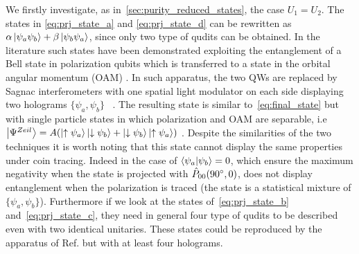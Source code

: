 \documentclass[
	aps, pra,
	superscriptaddress, twocolumn,
	floatfix,
	10pt
]{revtex4-1}
\newcommand{\parTitle}[1]{\noindent{\color{Mahogany}(\emph{#1})}}
\begin{document}
\parTitle{Case with same QW on both sides}
We firstly investigate, as in~\cref{sec:purity_reduced_states}, the case $U_1 = U_2$. The states in \cref{eq:prj_state_a} and  \cref{eq:prj_state_d} can be rewritten as $\alpha \ket{\psi_a \psi_b} + \beta \ket{\psi_b \psi_a}$, since only two type of qudits can be obtained.
In the literature such states have been demonstrated exploiting the entanglement of a Bell state in polarization qubits which is transferred to a state in the orbital angular momentum (OAM) .
In such apparatus, the two QWs are replaced by Sagnac interferometers with one spatial light modulator on each side displaying two holograms $\{\psi_a, \psi_b\}$~\cite{fickler2012quantum} . The resulting state is similar to~\cref{eq:final_state} but with single particle states in which polarization and OAM are separable, i.e $\ket{\Psi^{Zeil}}=A(\ket{\uparrow \psi_a}\ket{\downarrow \psi_b} +\ket{\downarrow \psi_b} \ket{\uparrow \psi_a})$ .
Despite the similarities of the two techniques  it is worth noting that this state cannot display the same properties under coin tracing.
Indeed in the case of $\braket{\psi_a}{\psi_b}=0$, which ensure the maximum negativity when the state is projected with $\hat{P}_{00}(90\degree,0)$, does not display entanglement when the polarization is traced (the state is a statistical mixture of $\{\psi_a, \psi_b\}$).
Furthermore if we look at the states of~\cref{eq:prj_state_b} and~\cref{eq:prj_state_c}, they need in general four type of qudits to be described even with two identical unitaries. These states could be reproduced by the apparatus of Ref. \cite{fickler2012quantum} but with at least four holograms.
\end{document}
